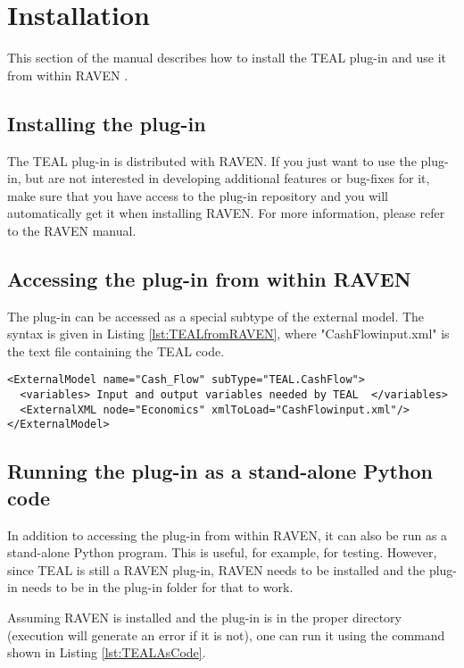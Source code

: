 \section{Installation}
\label{sec:Installation}

This section of the manual describes how to install the TEAL plug-in and use it from within RAVEN \cite{RAVEN}.

\subsection{Installing the plug-in}
The TEAL plug-in is distributed with RAVEN. If you just want to use the plug-in, but are not interested in developing additional features or bug-fixes for it, make sure that you have access to the plug-in repository and you will automatically get it when installing RAVEN.
For more information, please refer to the RAVEN manual.

\subsection{Accessing the plug-in from within RAVEN}
The plug-in can be accessed as a special subtype of the external model. The syntax is given in Listing \ref{lst:TEALfromRAVEN}, where "CashFlowinput.xml" is the text file containing the TEAL code.

\begin{lstlisting}[style=XML,morekeywords={anAttribute},caption=Call TEAL.CashFlow from RAVEN input., label=lst:TEALfromRAVEN]
<ExternalModel name="Cash_Flow" subType="TEAL.CashFlow">
  <variables> Input and output variables needed by TEAL  </variables>
  <ExternalXML node="Economics" xmlToLoad="CashFlowinput.xml"/>
</ExternalModel>
\end{lstlisting}

\subsection{Running the plug-in as a stand-alone Python code}

In addition to accessing the plug-in from within RAVEN, it can also be run as a stand-alone Python program. This is useful, for example, for testing. However,
since TEAL is still a RAVEN plug-in, RAVEN needs to be installed and the plug-in needs to be in the plug-in folder for that to work.

Assuming RAVEN is installed and the plug-in is in the proper directory (execution will generate an error if it is not), one can run it using the command shown in Listing \ref{lst:TEALAsCode}.

